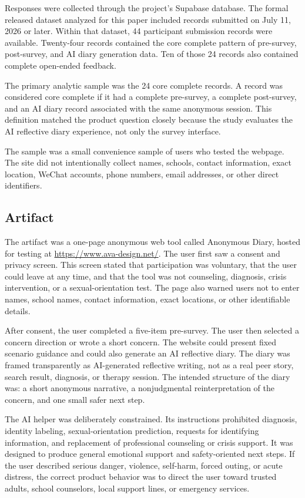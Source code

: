 Responses were collected through the project's Supabase database. The formal released dataset analyzed for this paper included records submitted on July 11, 2026 or later. Within that dataset, 44 participant submission records were available. Twenty-four records contained the core complete pattern of pre-survey, post-survey, and AI diary generation data. Ten of those 24 records also contained complete open-ended feedback.

The primary analytic sample was the 24 core complete records. A record was considered core complete if it had a complete pre-survey, a complete post-survey, and an AI diary record associated with the same anonymous session. This definition matched the product question closely because the study evaluates the AI reflective diary experience, not only the survey interface.

The sample was a small convenience sample of users who tested the webpage. The site did not intentionally collect names, schools, contact information, exact location, WeChat accounts, phone numbers, email addresses, or other direct identifiers.

\subsection{Artifact}

The artifact was a one-page anonymous web tool called Anonymous Diary, hosted for testing at \url{https://www.ava-design.net/}. The user first saw a consent and privacy screen. This screen stated that participation was voluntary, that the user could leave at any time, and that the tool was not counseling, diagnosis, crisis intervention, or a sexual-orientation test. The page also warned users not to enter names, school names, contact information, exact locations, or other identifiable details.

After consent, the user completed a five-item pre-survey. The user then selected a concern direction or wrote a short concern. The website could present fixed scenario guidance and could also generate an AI reflective diary. The diary was framed transparently as AI-generated reflective writing, not as a real peer story, search result, diagnosis, or therapy session. The intended structure of the diary was: a short anonymous narrative, a nonjudgmental reinterpretation of the concern, and one small safer next step.

The AI helper was deliberately constrained. Its instructions prohibited diagnosis, identity labeling, sexual-orientation prediction, requests for identifying information, and replacement of professional counseling or crisis support. It was designed to produce general emotional support and safety-oriented next steps. If the user described serious danger, violence, self-harm, forced outing, or acute distress, the correct product behavior was to direct the user toward trusted adults, school counselors, local support lines, or emergency services.

